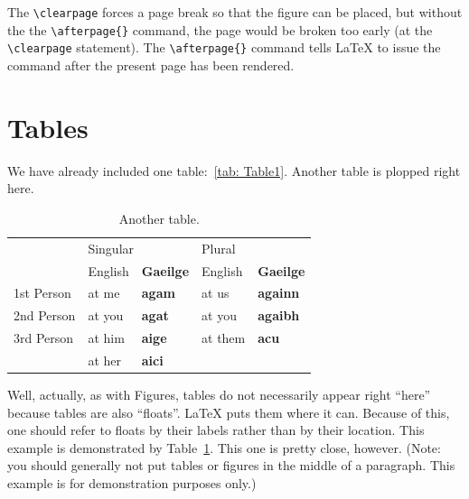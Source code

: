 \documentclass[msc,oneside]{ubcthesis}
\begin{document}
The \verb|\clearpage| forces a page break so that the figure can be
placed, but without the the \verb|\afterpage{}| command, the page
would be broken too early (at the \verb|\clearpage| statement).  The
\verb|\afterpage{}| command tells \LaTeX{} to issue the command after
the present page has been rendered.

\section{Tables}
We have already included one table:~\ref {tab: Table1}.  Another table
is plopped right here.
\begin{table}[ht]
  \begin{center}
    \begin{tabular}{|l||l|l||l|l|}
      \hline
      &\multicolumn{2}{l|}{Singular}&\multicolumn{2}{l|}{Plural}\\
      \cline{2-5}
       &English&\textbf{Gaeilge}&English&\textbf{Gaeilge}\\
      \hline\hline
      1st Person&at me&\textbf{agam}&at us&\textbf{againn}\\
      2nd Person&at you&\textbf{agat}&at you&\textbf{agaibh}\\
      3rd Person&at him&\textbf{aige}&at them&\textbf{acu}\\
       &at her&\textbf{aici}& & \\
      \hline
    \end{tabular}
    \caption{
      \label{tab:Table2}
      Another table.}
  \end{center}
\end{table}
Well, actually, as with Figures, tables do not
necessarily appear right ``here'' because tables are also ``floats''.
\LaTeX{} puts them where it can.  Because of this, one should refer to
floats by their labels rather than by their location.  This example is
demonstrated by Table~\ref{tab:Table2}.  This one is pretty close,
however.  (Note: you should generally not put tables or figures in the
middle of a paragraph.  This example is for demonstration purposes
only.)
\end{document}
